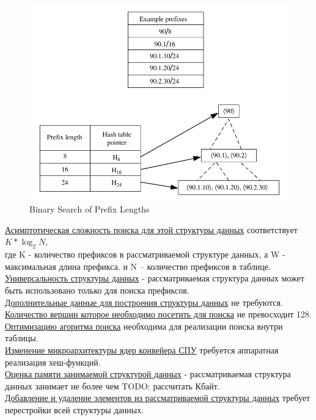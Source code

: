 \documentclass[a4peper, 12pt, titlepage, finall]{extreport}
\begin{document}
            \begin{figure}[h]
                \includegraphics[width=\textwidth]{binary_search.png}
                \caption{Binary Search of Prefix Lengths}
                \label{fig:mesh4}
            \end{figure}

            \underline{Асимптотическая сложность поиска для этой структуры данных} соответствует {\ttfamily $K*\log_2{N}$},\\
            где {\ttfamily K} - количество префиксов в рассматриваемой структуре данных, а {\ttfamily W} - максимальная длина префикса.
            и {\ttfamily N} -- количество префиксов в таблице.\\
            \underline{Универсальность структуры данных} - рассматриваемая структура данных может быть использовано только для поиска префиксов.\\
            \underline{Дополнительные данные для построения структуры данных} не требуются.\\
            \underline{Количество вершин которое необходимо посетить для поиска} не превосходит 128.\\
            \underline{Оптимизацию агоритма поиска} необходима для реализации поиска внутри таблицы.\\
            \underline{Изменение микроархитектуры ядер конвейера СПУ} требуется аппаратная реализация хеш-функций.\\
            \underline{Оценка памяти занимаемой структурой данных} - рассматриваемая структура данных занимает не более чем {\ttfamily TODO: рассчитать} Кбайт.\\
            \underline{Добавление и удаление элементов из рассматриваемой структуры данных} требует перестройки всей структуры данных.\\
\end{document}
